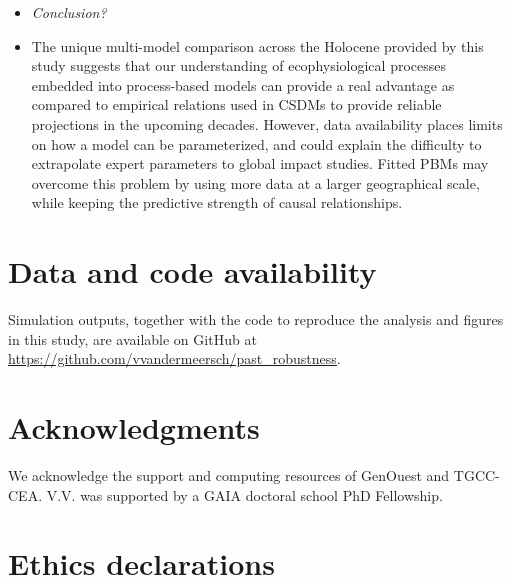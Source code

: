 \documentclass[pdflatex, sn-nature]{sn-jnl}%
\begin{document}
\begin{itemize}
\item \emph{Conclusion?}\par
\item The unique multi-model comparison across the Holocene provided by this study suggests that our understanding of ecophysiological processes embedded into process-based models can provide a real advantage as compared to empirical relations used in CSDMs to provide reliable projections in the upcoming decades. However, data availability places limits on how a model can be parameterized, and could explain the difficulty to extrapolate expert parameters to global impact studies. Fitted PBMs may overcome this problem by using more data at a larger geographical scale, while keeping the predictive strength of causal relationships.
\end{itemize}

\backmatter

\section*{Data and code availability}

Simulation outputs, together with the code to reproduce the analysis and figures in this study, are available on GitHub at \url{https://github.com/vvandermeersch/past_robustness}.

\section*{Acknowledgments}

We acknowledge the support and computing resources of GenOuest and TGCC-CEA. V.V. was supported by a GAIA doctoral school PhD Fellowship.

\section*{Ethics declarations}
\end{document}
